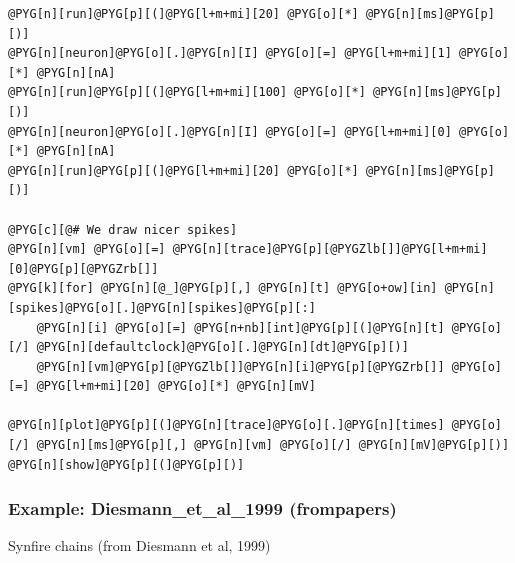 \documentclass[letterpaper,10pt,english]{manual}
\begin{document}
\begin{Verbatim}[commandchars=@\[\]]
@PYG[n][run]@PYG[p][(]@PYG[l+m+mi][20] @PYG[o][*] @PYG[n][ms]@PYG[p][)]
@PYG[n][neuron]@PYG[o][.]@PYG[n][I] @PYG[o][=] @PYG[l+m+mi][1] @PYG[o][*] @PYG[n][nA]
@PYG[n][run]@PYG[p][(]@PYG[l+m+mi][100] @PYG[o][*] @PYG[n][ms]@PYG[p][)]
@PYG[n][neuron]@PYG[o][.]@PYG[n][I] @PYG[o][=] @PYG[l+m+mi][0] @PYG[o][*] @PYG[n][nA]
@PYG[n][run]@PYG[p][(]@PYG[l+m+mi][20] @PYG[o][*] @PYG[n][ms]@PYG[p][)]

@PYG[c][@# We draw nicer spikes]
@PYG[n][vm] @PYG[o][=] @PYG[n][trace]@PYG[p][@PYGZlb[]]@PYG[l+m+mi][0]@PYG[p][@PYGZrb[]]
@PYG[k][for] @PYG[n][@_]@PYG[p][,] @PYG[n][t] @PYG[o+ow][in] @PYG[n][spikes]@PYG[o][.]@PYG[n][spikes]@PYG[p][:]
    @PYG[n][i] @PYG[o][=] @PYG[n+nb][int]@PYG[p][(]@PYG[n][t] @PYG[o][/] @PYG[n][defaultclock]@PYG[o][.]@PYG[n][dt]@PYG[p][)]
    @PYG[n][vm]@PYG[p][@PYGZlb[]]@PYG[n][i]@PYG[p][@PYGZrb[]] @PYG[o][=] @PYG[l+m+mi][20] @PYG[o][*] @PYG[n][mV]

@PYG[n][plot]@PYG[p][(]@PYG[n][trace]@PYG[o][.]@PYG[n][times] @PYG[o][/] @PYG[n][ms]@PYG[p][,] @PYG[n][vm] @PYG[o][/] @PYG[n][mV]@PYG[p][)]
@PYG[n][show]@PYG[p][(]@PYG[p][)]
\end{Verbatim}

\resetcurrentobjects
\hypertarget{--doc-examples-frompapers_Diesmann_et_al_1999}{}

\hypertarget{index-28}{}\subsubsection{Example: Diesmann\_et\_al\_1999 (frompapers)}

Synfire chains (from Diesmann et al, 1999)
\end{document}
